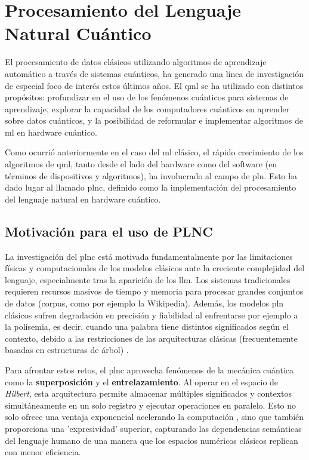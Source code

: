 \chapter{Procesamiento del Lenguaje Natural Cuántico}
\label{chap:plnc}

El procesamiento de datos clásicos utilizando algoritmos de aprendizaje automático a través de sistemas cuánticos, ha generado una línea de investigación de especial foco de interés estos últimos años. El \gls{qml} se ha utilizado con distintos propósitos: profundizar en el uso de los fenómenos cuánticos para sistemas de aprendizaje, explorar la capacidad de los computadores cuánticos en aprender sobre datos cuánticos, y la posibilidad de reformular e implementar algoritmos de \gls{ml} en hardware cuántico.

Como ocurrió anteriormente en el caso del \gls{ml} clásico, el rápido crecimiento de los algoritmos de \gls{qml}, tanto desde el lado del hardware como del software (en términos de dispositivos y algoritmos), ha involucrado al campo de \gls{pln}. Esto ha dado lugar al llamado \gls{plnc}, definido como la implementación del procesamiento del lenguaje natural en hardware cuántico.

\section{Motivación para el uso de PLNC}

La investigación del \gls{plnc} está motivada fundamentalmente por las limitaciones físicas y computacionales de los modelos clásicos ante la creciente complejidad del lenguaje, especialmente tras la aparición de los \gls{llm}. Los sistemas tradicionales requieren recursos masivos de tiempo y memoria para procesar grandes conjuntos de datos (corpus, como por ejemplo la Wikipedia). Además, los modelos \gls{pln} clásicos sufren degradación en precisión y fiabilidad al enfrentarse por ejemplo a la polisemia, es decir, cuando una palabra tiene distintos significados según el contexto, debido a las restricciones de las arquitecturas clásicas (frecuentemente basadas en estructuras de árbol) \cite{guarasci_qnlp_2022}.

Para afrontar estos retos, el \gls{plnc} aprovecha fenómenos de la mecánica cuántica como la \textbf{superposición} y el \textbf{entrelazamiento}. Al operar en el espacio de \textit{Hilbert}, esta arquitectura permite almacenar múltiples significados y contextos simultáneamente en un solo registro y ejecutar operaciones en paralelo. Esto no solo ofrece una ventaja exponencial acelerando la computación \cite{qnlp_comp_survey}, sino que también proporciona una 'expresividad' superior, capturando las dependencias semánticas del lenguaje humano de una manera que los espacios numéricos clásicos replican con menor eficiencia.

